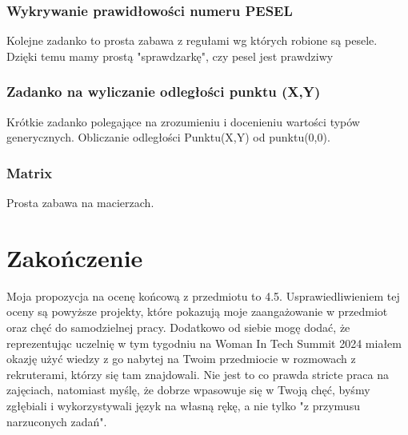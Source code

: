 \documentclass{article}
\begin{document}
\subsubsection{Wykrywanie prawidłowości numeru PESEL}

Kolejne zadanko to prosta zabawa z regułami wg których robione są pesele. Dzięki temu mamy prostą "sprawdzarkę", czy pesel jest prawdziwy

\subsubsection{Zadanko na wyliczanie odległości punktu (X,Y)}

Krótkie zadanko polegające na zrozumieniu i docenieniu wartości typów generycznych. Obliczanie odległości Punktu(X,Y) od punktu(0,0).

\subsubsection{Matrix}

Prosta zabawa na macierzach.

\section{Zakończenie}

Moja propozycja na ocenę końcową z przedmiotu to 4.5. Usprawiedliwieniem tej oceny są powyższe projekty, które pokazują moje zaangażowanie w przedmiot oraz chęć do samodzielnej pracy. Dodatkowo od siebie mogę dodać, że reprezentując uczelnię w tym tygodniu na Woman In Tech Summit 2024 miałem okazję użyć wiedzy z go nabytej na Twoim przedmiocie w rozmowach z rekruterami, którzy się tam znajdowali. Nie jest to co prawda stricte praca na zajęciach, natomiast myślę, że dobrze wpasowuje się w Twoją chęć, byśmy zgłębiali i wykorzystywali język na własną rękę, a nie tylko "z przymusu narzuconych zadań".
\end{document}

